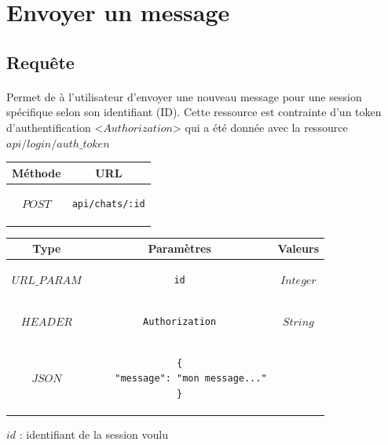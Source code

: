 \documentclass[titlepage, 12pt]{report}
\begin{document}
%
%
\section{Envoyer un message}

\subsection{Requête}

\paragraph{} Permet de à l'utilisateur d'envoyer une nouveau message pour une session spécifique selon son identifiant (ID). Cette ressource est contrainte d'un token d'authentification <$Authorization$> qui a été donnée avec la ressource $api/login/auth\_token$

\begin{center}
	\begin{tabular}{|c|c|}
	\hline
	Méthode & URL \\
	\hline
	$ POST $ 
	&
	\begin{lstlisting}
api/chats/:id
	\end{lstlisting} 
	\\ \hline
	\end{tabular}
\end{center}


\begin{center}
	\begin{tabular}{|c|c|c|}
	\hline
	Type & Paramètres & Valeurs \\ \hline
	$ URL\_PARAM $ & 
	\begin{lstlisting}
id
	\end{lstlisting} &
	$ Integer $ \\ \hline
	$ HEADER $ & 
	\begin{lstlisting}
Authorization
	\end{lstlisting} &
	$ String $ \\ \hline
	$ JSON $ & 
	\begin{lstlisting}
{
	"message": "mon message..."
}
	\end{lstlisting} & \makecell{$ String $} \\  \hline
	
	\end{tabular}
\end{center}

\par $ id $ : identifiant de la session voulu
\end{document}
